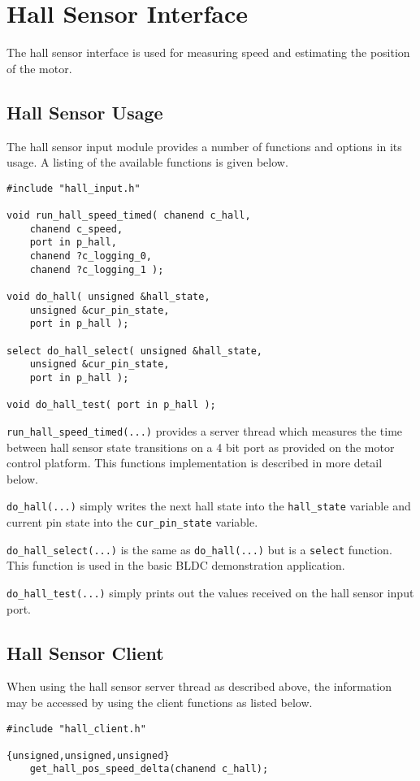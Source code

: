 \section{Hall Sensor Interface}
The hall sensor interface is used for measuring speed and estimating the position of the motor. 

\subsection{Hall Sensor Usage}
The hall sensor input module provides a number of functions and options in its usage. A listing of the available functions is given below.

\begin{lstlisting}
#include "hall_input.h"

void run_hall_speed_timed( chanend c_hall, 
	chanend c_speed, 
	port in p_hall, 
	chanend ?c_logging_0, 
	chanend ?c_logging_1 );

void do_hall( unsigned &hall_state, 
	unsigned &cur_pin_state, 
	port in p_hall );
	
select do_hall_select( unsigned &hall_state, 
	unsigned &cur_pin_state, 
	port in p_hall );

void do_hall_test( port in p_hall );
\end{lstlisting}

\verb=run_hall_speed_timed(...)= provides a server thread which measures the time between hall sensor state transitions on a 4 bit port as provided on the motor control platform. This functions implementation is described in more detail below.

\verb=do_hall(...)= simply writes the next hall state into the \verb=hall_state= variable and current pin state into the \verb=cur_pin_state= variable.

\verb=do_hall_select(...)= is the same as \verb=do_hall(...)= but is a \verb=select= function. This function is used in the basic BLDC demonstration application.

\verb=do_hall_test(...)= simply prints out the values received on the hall sensor input port.

\subsection{Hall Sensor Client}
When using the hall sensor server thread as described above, the information may be accessed by using the client functions as listed below.

\begin{lstlisting}
#include "hall_client.h"

{unsigned,unsigned,unsigned} 
	get_hall_pos_speed_delta(chanend c_hall);
\end{lstlisting}

